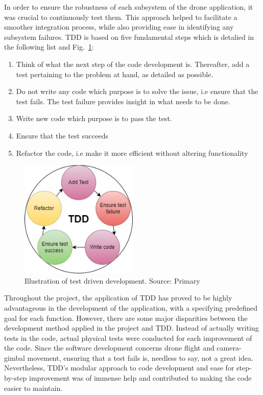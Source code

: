 In order to ensure the robustness of each subsystem of the drone application, it was crucial to continuously test them. This approach helped to facilitate a smoother integration process, while also providing ease in identifying any subsystem failures. TDD is based on five fundamental steps which is detalied in the following list and Fig.~\ref{fig:TDD}:
\vspace{0.2cm}
\begin{enumerate}
    \item Think of what the next step of the code development is. Thereafter, add a test pertaining to the problem at hand, as detailed as possible.
    \item Do not write any code which purpose is to solve the issue, i.e ensure that the test fails. The test failure provides insight in what needs to be done.
    \item Write new code which purpose is to pass the test. 
    \item Ensure that the test succeeds
    \item Refactor the code, i.e make it more efficient without altering functionality
\end{enumerate}
\begin{figure}[H]
  \centering
  \includegraphics[width=0.5\textwidth]{figure/TDD.jpg}
  \caption{Illustration of test driven development. Source: Primary}
  \label{fig:TDD}
\end{figure}
Throughout the project, the application of TDD has proved to be highly advantageous in the development of the application, with a specifying predefined goal for each function. However, there are some major disparities between the development method applied in the project and TDD. Instead of actually writing tests in the code, actual physical tests were conducted for each improvement of the code. Since the software development concerns drone flight and camera-gimbal movement, ensuring that a test fails is, needless to say, not a great idea. Nevertheless, TDD's modular approach to code development and ease for step-by-step improvement was of immense help and contributed to making the code easier to maintain. 


